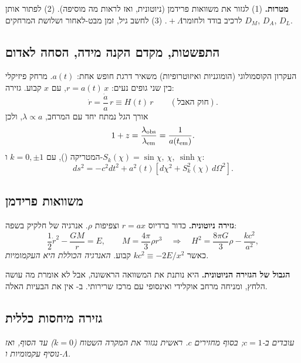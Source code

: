 
\begin{goalbox}
\textbf{מטרות.} (1) לגזור את משוואות פרידמן (ניוטונית, ואז לראות מה  מוסיפה). (2) לפתור אותן לרכיב בודד ולחומר${}+\Lambda$. (3) לחשב גיל, זמן מבט-לאחור ושלושת המרחקים $D_M$, $D_A$, $D_L$.
\end{goalbox}

\subsection{התפשטות, מקדם הקנה מידה, הסחה לאדום}
העקרון הקוסמולוגי (הומוגניות ואיזוטרופיות) משאיר דרגת חופש אחת: $a(t)$. מרחק פיזיקלי בין שני גופים נעים: $r=a(t)\,x$, עם $x$ קבוע. גזירה:
\begin{equation}
\dot r=\frac{\dot a}{a}\,r\equiv H(t)\,r \qquad(\text{חוק האבל}).
\end{equation}
אורך הגל נמתח יחד עם המרחב, $\lambda\propto a$, ולכן
\begin{equation}
1+z=\frac{\lambda_{\rm obs}}{\lambda_{\rm em}}=\frac{1}{a(t_{\rm em})} .
\end{equation}
המטריקה (), עם $k=0,\pm1$ ו-$S_k(\chi)=\sin\chi,\ \chi,\ \sinh\chi$:
\begin{equation}
ds^2=-c^2dt^2+a^2(t)\left[d\chi^2+S_k^2(\chi)\,d\Omega^2\right].
\end{equation}

\subsection{משוואות פרידמן}
\textbf{גזירה ניוטונית.} כדור ברדיוס $r=ax$ וצפיפות $\rho$. אנרגיה של חלקיק בשפה:
\begin{equation}
\frac12\dot r^2-\frac{GM}{r}=E,\qquad M=\frac{4\pi}{3}\rho r^3
\quad\Longrightarrow\quad
H^2=\frac{8\pi G}{3}\rho-\frac{kc^2}{a^2},
\end{equation}
כאשר $kc^2\equiv-2E/x^2$ קבוע. \emph{האנרגיה הכוללת היא העקמומיות.}

\textbf{הגבול של הגזירה הניוטונית.} היא נותנת את המשוואה הראשונה, אבל לא אומרת מה עושה הלחץ, ומניחה מרחב אוקלידי ואינסופי עם מרכז שרירותי. ב- אין את הבעיות האלה.

\subsection{גזירה מיחסות כללית}
\emph{עובדים ב-$c=1$; בסוף מחזירים $c$. ראשית נגזור את המקרה השטוח ($k=0$) עד הסוף, ואז נוסיף עקמומיות ו-$\Lambda$.}

